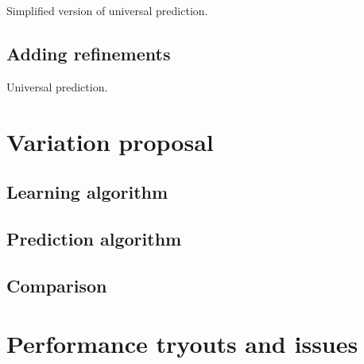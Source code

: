 \documentclass[a4paper,12pt]{article}
\begin{document}
    \begin{algorithm}

      \caption{\label{simplified}Simplified version of universal prediction.}
    \end{algorithm}

  \subsection{Adding refinements}

    \begin{algorithm}

      \caption{\label{simplified}Universal prediction.}
    \end{algorithm}

    \section{Variation proposal}\label{variation_algo}


  \subsection{Learning algorithm}

  \subsection{Prediction algorithm}

  \subsection{Comparison}


  \section{Performance tryouts and issues}\label{tests}
\end{document}
